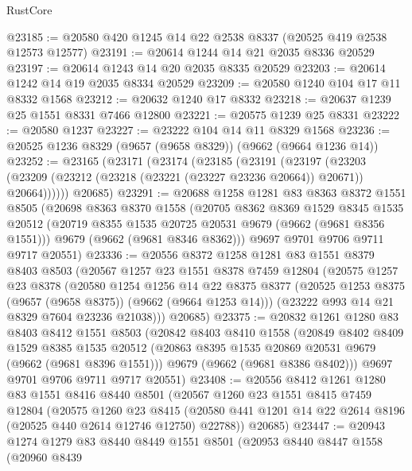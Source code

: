 \begin{lexlean}{RustCore}
\begin{coremodule}
@23185 := @20580 @420 @1245 @14 @22 @2538 @8337 (@20525 @419 @2538 @12573 @12577)
@23191 := @20614 @1244 @14 @21 @2035 @8336 @20529
@23197 := @20614 @1243 @14 @20 @2035 @8335 @20529
@23203 := @20614 @1242 @14 @19 @2035 @8334 @20529
@23209 := @20580 @1240 @104 @17 @11 @8332 @1568
@23212 := @20632 @1240 @17 @8332
@23218 := @20637 @1239 @25 @1551 @8331 @7466 @12800
@23221 := @20575 @1239 @25 @8331
@23222 := @20580 @1237
@23227 := @23222 @104 @14 @11 @8329 @1568
@23236 := @20525 @1236 @8329 (@9657 (@9658 @8329)) (@9662 (@9664 @1236 @14))
@23252 := @23165
    (@23171
      (@23174
        (@23185
          (@23191
            (@23197
              (@23203 (@23209 (@23212 (@23218 (@23221 (@23227 @23236 @20664)) @20671)) @20664))))))
      @20685)
@23291 := @20688
    @1258
    @1281
    @83
    @8363
    @8372
    @1551
    @8505
    (@20698
      @8363
      @8370
      @1558
      (@20705
        @8362
        @8369
        @1529
        @8345
        @1535
        @20512
        (@20719 @8355 @1535 @20725 @20531 @9679 (@9662 (@9681 @8356 @1551)))
        @9679
        (@9662 (@9681 @8346 @8362)))
      @9697
      @9701
      @9706
      @9711
      @9717
      @20551)
@23336 := @20556
    @8372
    @1258
    @1281
    @83
    @1551
    @8379
    @8403
    @8503
    (@20567
      @1257
      @23
      @1551
      @8378
      @7459
      @12804
      (@20575
        @1257
        @23
        @8378
        (@20580
          @1254
          @1256
          @14
          @22
          @8375
          @8377
          (@20525 @1253 @8375 (@9657 (@9658 @8375)) (@9662 (@9664 @1253 @14)))
          (@23222 @993 @14 @21 @8329 @7604 @23236 @21038)))
      @20685)
@23375 := @20832
    @1261
    @1280
    @83
    @8403
    @8412
    @1551
    @8503
    (@20842
      @8403
      @8410
      @1558
      (@20849
        @8402
        @8409
        @1529
        @8385
        @1535
        @20512
        (@20863 @8395 @1535 @20869 @20531 @9679 (@9662 (@9681 @8396 @1551)))
        @9679
        (@9662 (@9681 @8386 @8402)))
      @9697
      @9701
      @9706
      @9711
      @9717
      @20551)
@23408 := @20556
    @8412
    @1261
    @1280
    @83
    @1551
    @8416
    @8440
    @8501
    (@20567
      @1260
      @23
      @1551
      @8415
      @7459
      @12804
      (@20575
        @1260
        @23
        @8415
        (@20580 @441 @1201 @14 @22 @2614 @8196 (@20525 @440 @2614 @12746 @12750) @22788))
      @20685)
@23447 := @20943
    @1274
    @1279
    @83
    @8440
    @8449
    @1551
    @8501
    (@20953
      @8440
      @8447
      @1558
      (@20960
        @8439

\end{coremodule}
\end{lexlean}
